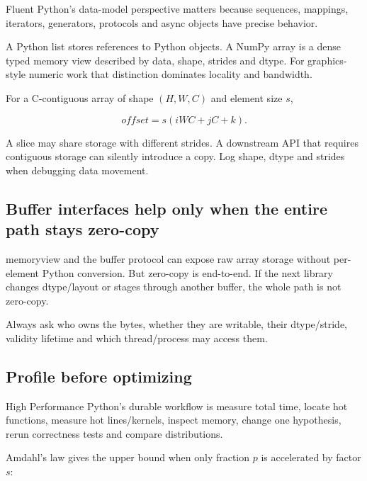 Fluent Python's data-model perspective matters because sequences, mappings, iterators, generators, protocols and async objects have precise behavior.

A Python list stores references to Python objects. A NumPy array is a dense typed memory view described by data, shape, strides and dtype. For graphics-style numeric work that distinction dominates locality and bandwidth.

For a C-contiguous array of shape \((H,W,C)\) and element size \(s\),

\[
offset=s(iWC+jC+k).
\]

A slice may share storage with different strides. A downstream API that requires contiguous storage can silently introduce a copy. Log shape, dtype and strides when debugging data movement.

\subsection{Buffer interfaces help only when the entire path stays zero-copy}\label{01-foundations-i-ch017-buffer-interfaces-help-only-when-the-entire-path-stays-zero-copy}

\hypertarget{01-foundations-i-ch017-buffer-interfaces-help-only-when-the-entire-path-stays-zero-copy}{}

memoryview and the buffer protocol can expose raw array storage without per-element Python conversion. But zero-copy is end-to-end. If the next library changes dtype/layout or stages through another buffer, the whole path is not zero-copy.

Always ask who owns the bytes, whether they are writable, their dtype/stride, validity lifetime and which thread/process may access them.

\subsection{Profile before optimizing}\label{01-foundations-i-ch017-profile-before-optimizing}

\hypertarget{01-foundations-i-ch017-profile-before-optimizing}{}

High Performance Python's durable workflow is measure total time, locate hot functions, measure hot lines/kernels, inspect memory, change one hypothesis, rerun correctness tests and compare distributions.

Amdahl's law gives the upper bound when only fraction \(p\) is accelerated by factor \(s\):


